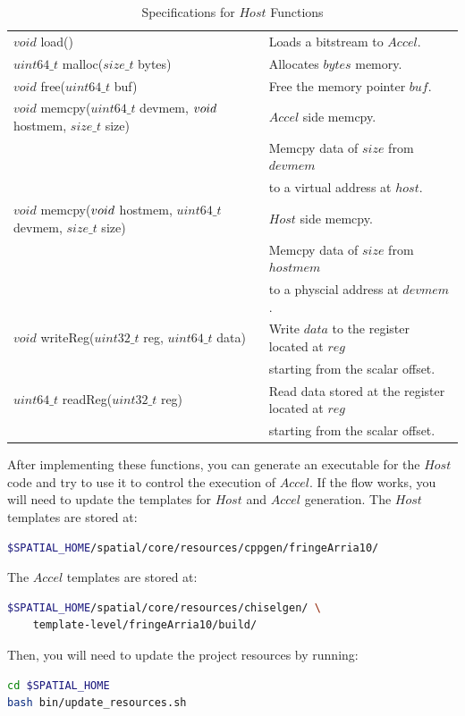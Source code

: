 \documentclass{article}
\begin{document}
\begin{table}[t]
\centering
\scriptsize
\begin{tabular}{ll}
   $void$ load() & Loads a bitstream to $Accel$. \\
   $uint64\_t$ malloc($size\_t$ bytes) & Allocates $bytes$ memory. \\
   $void$ free($uint64\_t$ buf) & Free the memory pointer $buf$. \\
   $void$ memcpy($uint64\_t$ devmem, $void\*$ hostmem, $size\_t$ size) & $Accel$ side memcpy. \\ 
   & Memcpy data of $size$ from $devmem$ \\
   & to a virtual address at $host$. \\
   $void$ memcpy($void\*$ hostmem, $uint64\_t$ devmem, $size\_t$ size) & $Host$ side memcpy. \\
   & Memcpy data of $size$ from $hostmem$ \\
   & to a physcial address at $devmem$. \\
   $void$ writeReg($uint32\_t$ reg, $uint64\_t$ data) & Write $data$ to the register located at $reg$ \\
   & starting from the scalar offset. \\
   $uint64\_t$ readReg($uint32\_t$ reg) & Read data stored at the register located at $reg$ \\
   & starting from the scalar offset.
\end{tabular}
  \caption{Specifications for $Host$ Functions}
  \label{API}
\end{table}

After implementing these functions, you can generate an executable for the $Host$ code and try to use it to control the execution of $Accel$.
If the flow works, you will need to update the templates for $Host$ and $Accel$ generation.
The $Host$ templates are stored at:
\begin{lstlisting}[language=bash]
$SPATIAL_HOME/spatial/core/resources/cppgen/fringeArria10/
\end{lstlisting}

The $Accel$ templates are stored at:
\begin{lstlisting}[language=bash]
$SPATIAL_HOME/spatial/core/resources/chiselgen/ \
    template-level/fringeArria10/build/
\end{lstlisting}

Then, you will need to update the project resources by running:
\begin{lstlisting}[language=bash]
cd $SPATIAL_HOME
bash bin/update_resources.sh
\end{lstlisting}
\end{document}
